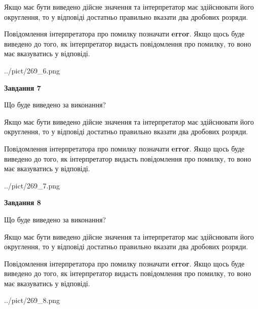 \documentclass[12pt, ukrainian]{article}
\begin{document}
{\begin {Large}
Якщо має бути виведено дійсне значення та інтерпретатор має здійснювати його округлення, 
то у відповіді достатньо правильно вказати два дробових розряди.

Повідомлення інтерпретатора про помилку позначати \textbf{error}.
Якщо щось буде виведено до того, як інтерпретатор видасть повідомлення про помилку, 
то воно має вказуватись у відповіді. \par

\begin{center}
	{../pict/269_6.png}
\end{center}
\newpage

{\begin {center}\textbf{Завдання 7}\end {center}}\par
Що буде виведено за виконання? \par

Якщо має бути виведено дійсне значення та інтерпретатор має здійснювати його округлення, 
то у відповіді достатньо правильно вказати два дробових розряди.

Повідомлення інтерпретатора про помилку позначати \textbf{error}.
Якщо щось буде виведено до того, як інтерпретатор видасть повідомлення про помилку, 
то воно має вказуватись у відповіді. \par

\begin{center}
	{../pict/269_7.png}
\end{center}
\newpage

{\begin {center}\textbf{Завдання 8}\end {center}}\par
Що буде виведено за виконання? \par

Якщо має бути виведено дійсне значення та інтерпретатор має здійснювати його округлення, 
то у відповіді достатньо правильно вказати два дробових розряди.

Повідомлення інтерпретатора про помилку позначати \textbf{error}.
Якщо щось буде виведено до того, як інтерпретатор видасть повідомлення про помилку, 
то воно має вказуватись у відповіді. \par

\begin{center}
	{../pict/269_8.png}
\end{center}
\newpage


\end{Large}}
\end{document}
